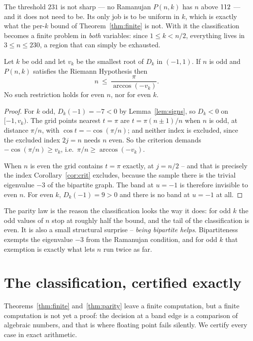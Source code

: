 \begin{remark}
The threshold $231$ is not sharp --- no Ramanujan $P(n,k)$ has $n$ above
$112$ --- and it does not need to be. Its only job is to be uniform in
$k$, which is exactly what the per-$k$ bound of Theorem~\ref{thm:finite} is
not. With it the classification becomes a finite problem in \emph{both}
variables: since $1\le k<n/2$, everything lives in $3\le n\le230$, a region
that can simply be exhausted.
\end{remark}

\begin{theorem}\label{thm:parity}
Let $k$ be odd and let $v_k$ be the smallest root of $D_k$ in $(-1,1)$. If $n$
is odd and $P(n,k)$ satisfies the Riemann Hypothesis then
\[
  n\ \le\ \frac{\pi}{\arccos(-v_k)} .
\]
No such restriction holds for even $n$, nor for even $k$.
\end{theorem}

\begin{proof}
For $k$ odd, $D_k(-1)=-7<0$ by Lemma~\ref{lem:signs}, so $D_k<0$ on
$[-1,v_k)$. The grid points nearest $t=\pi$ are $t=\pi(n\pm1)/n$ when $n$ is
odd, at distance $\pi/n$, with $\cos t=-\cos(\pi/n)$; and neither index is
excluded, since the excluded index $2j=n$ needs $n$ even. So the criterion
demands $-\cos(\pi/n)\ge v_k$, i.e.\ $\pi/n\ge\arccos(-v_k)$.

When $n$ is even the grid contains $t=\pi$ exactly, at $j=n/2$ -- and that is
precisely the index Corollary~\ref{cor:crit} excludes, because the sample there
is the trivial eigenvalue $-3$ of the bipartite graph. The band at $u=-1$ is
therefore invisible to even $n$. For even $k$, $D_k(-1)=9>0$ and there is no
band at $u=-1$ at all.
\end{proof}

The parity law is the reason the classification looks the way it does: for odd
$k$ the odd values of $n$ stop at roughly half the bound, and the tail of the
classification is even. It is also a small structural surprise -- \emph{being
bipartite helps}. Bipartiteness exempts the eigenvalue $-3$ from the Ramanujan
condition, and for odd $k$ that exemption is exactly what lets $n$ run twice as
far.

\section{The classification, certified exactly}\label{sec:ramcert}

Theorems~\ref{thm:finite} and~\ref{thm:parity} leave a finite computation, but a
finite computation is not yet a proof: the decision at a band edge is a
comparison of algebraic numbers, and that is where floating point fails
silently. We certify every case in exact arithmetic.

